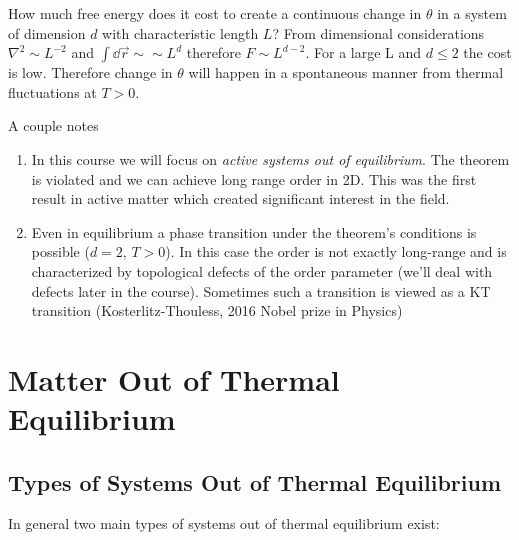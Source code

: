 
How much free energy does it cost to create a continuous change in \(\theta \) in a system of dimension \(d\) with characteristic length \(L\)? From dimensional considerations \(\nabla^2 \sim L^{-2}\) and \(\int\dd \vec{r} \sim \sim L^d\) therefore \(F\sim L^{d-2}\). For a large L and \(d\leq 2\) the cost is low. Therefore change in \(\theta \) will happen in a spontaneous manner from thermal fluctuations at \(T>0\).

A couple notes

\begin{enumerate}
	\item In this course we will focus on \emph{active systems out of equilibrium}. The theorem is violated and we can achieve long range order in 2D. This was the first result in active matter which created significant interest in the field.
	\item Even in equilibrium a phase transition under the theorem's conditions is possible (\(d=2\), \(T>0\)). In this case the order is not exactly long-range and is characterized by topological defects of the order parameter (we'll deal with defects later in the course). Sometimes such a transition is viewed as a KT transition (Kosterlitz-Thouless, 2016 Nobel prize in Physics)
\end{enumerate}

\clearpage
\section{Matter Out of Thermal Equilibrium}

\subsection{Types of Systems Out of Thermal Equilibrium}

In general two main types of systems out of thermal equilibrium exist:

